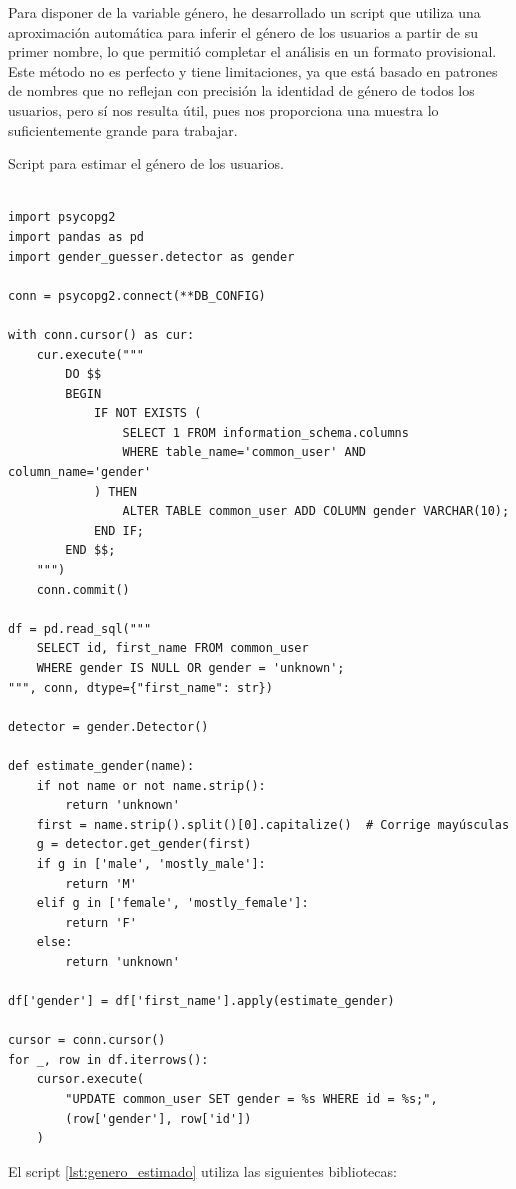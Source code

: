 \documentclass[a4paper, 12pt]{book}
\begin{document}
Para disponer de la variable género, he desarrollado un script que utiliza una aproximación automática para inferir el género de los usuarios a partir de su primer nombre, lo que permitió completar el análisis en un formato provisional. Este método no es perfecto y tiene limitaciones, ya que está basado en patrones de nombres que no reflejan con precisión la identidad de género de todos los usuarios, pero sí nos resulta útil, pues nos proporciona una muestra lo suficientemente grande para trabajar.

\begin{listing}[h!]
\caption{Script para estimar el género de los usuarios.}
\label{lst:genero_estimado}
\begin{verbatim}

import psycopg2
import pandas as pd
import gender_guesser.detector as gender

conn = psycopg2.connect(**DB_CONFIG)

with conn.cursor() as cur:
    cur.execute("""
        DO $$
        BEGIN
            IF NOT EXISTS (
                SELECT 1 FROM information_schema.columns 
                WHERE table_name='common_user' AND column_name='gender'
            ) THEN
                ALTER TABLE common_user ADD COLUMN gender VARCHAR(10);
            END IF;
        END $$;
    """)
    conn.commit()

df = pd.read_sql("""
    SELECT id, first_name FROM common_user 
    WHERE gender IS NULL OR gender = 'unknown';
""", conn, dtype={"first_name": str})

detector = gender.Detector()

def estimate_gender(name):
    if not name or not name.strip():
        return 'unknown'
    first = name.strip().split()[0].capitalize()  # Corrige mayúsculas
    g = detector.get_gender(first)
    if g in ['male', 'mostly_male']:
        return 'M'
    elif g in ['female', 'mostly_female']:
        return 'F'
    else:
        return 'unknown'

df['gender'] = df['first_name'].apply(estimate_gender)

cursor = conn.cursor()
for _, row in df.iterrows():
    cursor.execute(
        "UPDATE common_user SET gender = %s WHERE id = %s;",
        (row['gender'], row['id'])
    )

\end{verbatim}
\end{listing}

El script \ref{lst:genero_estimado} utiliza las siguientes bibliotecas:
\end{document}
